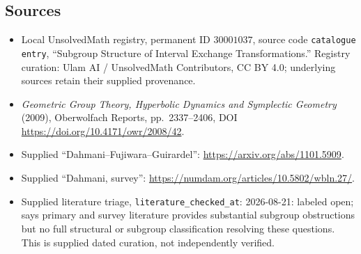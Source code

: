 \documentclass[11pt]{article}
\begin{document}
\subsection{Sources}
\begin{itemize}
\item Local UnsolvedMath registry, permanent ID \(30001037\), source code \texttt{catalogue entry}, ``Subgroup Structure of Interval Exchange Transformations.'' Registry curation: Ulam AI / UnsolvedMath Contributors, CC BY 4.0; underlying sources retain their supplied provenance.
\item \emph{Geometric Group Theory, Hyperbolic Dynamics and Symplectic Geometry} (2009), Oberwolfach Reports, pp.\ 2337--2406, DOI \url{https://doi.org/10.4171/owr/2008/42}.
\item Supplied ``Dahmani--Fujiwara--Guirardel'': \url{https://arxiv.org/abs/1101.5909}.
\item Supplied ``Dahmani, survey'': \url{https://numdam.org/articles/10.5802/wbln.27/}.
\item Supplied literature triage, \texttt{literature\_checked\_at}: 2026-08-21: labeled open; says primary and survey literature provides substantial subgroup obstructions but no full structural or subgroup classification resolving these questions. This is supplied dated curation, not independently verified.
\end{itemize}
\end{document}
